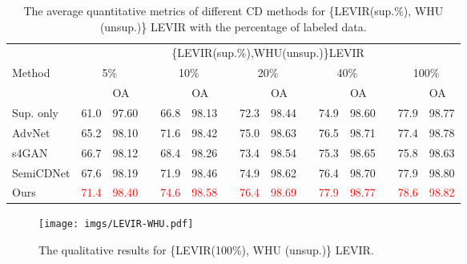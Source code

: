 \documentclass[runningheads]{llncs}
\begin{document}
\begin{table}[tb]
	\centering
	\scriptsize
	\caption{The average quantitative metrics of different CD methods for \{LEVIR(sup.\%), WHU (unsup.)\}  LEVIR with the percentage of labeled data.\vspace{-2mm}}
	\begin{tabular}{lllcllcllcllcll} \toprule
		 & \multicolumn{14}{c}{\{LEVIR(sup.\%),WHU(unsup.)\}LEVIR} \\
		\cmidrule{2-15}
		\multirow{2}{*}{\parbox[c]{.2\linewidth}{Method}} & \multicolumn{2}{c}{5\%} & & \multicolumn{2}{c}{10\%} & & \multicolumn{2}{c}{20\%} & & \multicolumn{2}{c}{40\%} & & \multicolumn{2}{c}{100\%}\\ 
		\cmidrule{2-3} \cmidrule{5-6} \cmidrule{8-9} \cmidrule{11-12} \cmidrule{14-15}
		
		& {} & {OA} && {} & {OA} & & {} & {OA} &&{} & {OA} &&{} & {OA}\\
		\midrule
		Sup. only   &   61.0 & 97.60 && 66.8 & 98.13 && 72.3 & 98.44 && 74.9 & 98.60 && 77.9 & 98.77\\ AdvNet\cite{advnet}&65.2 & 98.10 && 71.6 & 98.42 && 75.0 & 98.63 && 76.5 & 98.71 && 77.4 & 98.78\\ s4GAN\cite{s4GAN}&66.7 & 98.12 && 68.4 & 98.26 && 73.4 & 98.54 && 75.3 & 98.65 && 75.8 & 98.63\\ SemiCDNet\cite{SemiCDNet} & 67.6 & 98.19 && 71.9 & 98.46 && 74.9 & 98.62 && 76.4 & 98.70 && 77.9 & 98.80\\ Ours        &   \textcolor{red}{71.4} & \textcolor{red}{98.40} && \textcolor{red}{74.6} & \textcolor{red}{98.58} && \textcolor{red}{76.4} & \textcolor{red}{98.69} && \textcolor{red}{77.9} & \textcolor{red}{98.77} &&
		                \textcolor{red}{78.6} & \textcolor{red}{98.82}\\ \bottomrule
	\end{tabular}
	
	\normalsize
	\label{tab:diferent_unl}
\end{table}
\begin{figure}[tb]
    \centering
    \texttt{[image: imgs/LEVIR-WHU.pdf]}
    \caption{The qualitative results for \{LEVIR(100\%), WHU (unsup.)\} LEVIR.\vspace{-5mm}}
    \label{fig:qual_cross_data}
\end{figure}
\vspace{-3mm}
\end{document}
